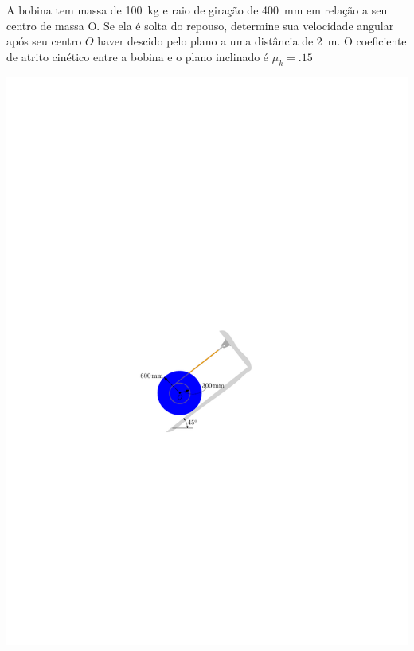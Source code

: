 \item A bobina tem massa de \SI{100}{\kilogram} e raio de giração de \SI{400}{\milli\meter} em relação a seu centro de massa O. Se ela é solta do repouso, determine sua velocidade angular após seu centro $O$ haver descido pelo plano a uma distância de \SI{2}{\meter}. O coeficiente de atrito cinético entre a bobina e o plano inclinado é $\mu_{k}=\SI{.15}{}$

\vspace{-1cm}
\begin{flushright}
	\includegraphics[scale=1.3]{../../images/draw_3_1}
\end{flushright}